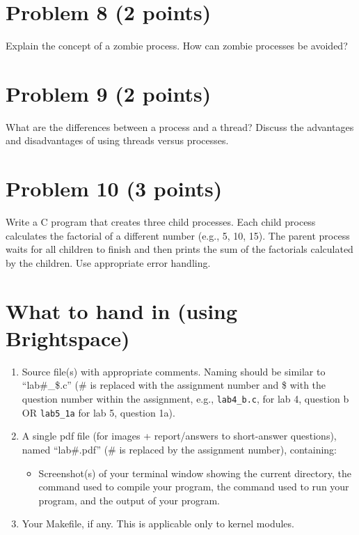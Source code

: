 \documentclass{article}
\begin{document}
\section*{Problem 8 (2 points)}
Explain the concept of a zombie process. How can zombie processes be avoided?


\section*{Problem 9 (2 points)}
What are the differences between a process and a thread?  Discuss the advantages and disadvantages of using threads versus processes.


\section*{Problem 10 (3 points)}
Write a C program that creates three child processes. Each child process calculates the factorial of a different number (e.g., 5, 10, 15).  The parent process waits for all children to finish and then prints the sum of the factorials calculated by the children.  Use appropriate error handling.


\section*{What to hand in (using Brightspace)}

\begin{enumerate}
    \item Source file(s) with appropriate comments.  Naming should be similar to “lab\#\_\$.c” (\# is replaced with the assignment number and \$ with the question number within the assignment, e.g., \texttt{lab4\_b.c}, for lab 4, question b OR \texttt{lab5\_1a} for lab 5, question 1a).
    \item A single pdf file (for images + report/answers to short-answer questions), named “lab\#.pdf” (\# is replaced by the assignment number), containing:
    \begin{itemize}
        \item Screenshot(s) of your terminal window showing the current directory, the command used to compile your program, the command used to run your program, and the output of your program.
    \end{itemize}
    \item Your Makefile, if any. This is applicable only to kernel modules.
\end{enumerate}
\end{document}
